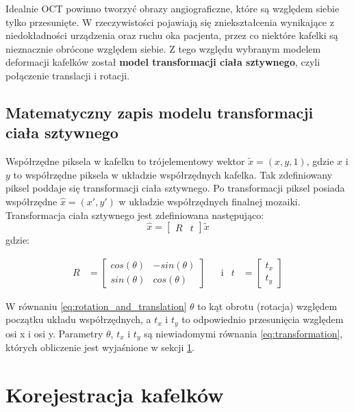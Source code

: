 Idealnie OCT powinno tworzyć obrazy angiograficzne, które są względem siebie tylko przesunięte. W rzeczywistości pojawiają się zniekształcenia wynikające z niedokładności urządzenia oraz ruchu oka pacjenta, przez co niektóre kafelki są nieznacznie obrócone względem siebie. Z tego względu wybranym modelem deformacji kafelków został \textbf{model transformacji ciała sztywnego}, czyli połączenie translacji i rotacji.

\subsection{Matematyczny zapis modelu transformacji ciała sztywnego}

Współrzędne piksela w kafelku to trójelementowy wektor $\widetilde{x}=(x, y, 1)$, gdzie $x$ i $y$ to współrzędne piksela w układzie współrzędnych kafelka. Tak zdefiniowany piksel poddaje się transformacji ciała sztywnego. Po transformacji piksel posiada współrzędne $\hat{x}=(x', y')$ w układzie współrzędnych finalnej mozaiki. Transformacja ciała sztywnego jest zdefiniowana następująco:
\begin{equation}
\hat{x}=\begin{bmatrix}R&t\end{bmatrix}\widetilde{x}
\label{eq:transformation}
\end{equation}
gdzie:

\begin{align}
R &= \begin{bmatrix}cos(\theta)&-sin(\theta)\\sin(\theta)&cos(\theta)\end{bmatrix} &&\text{i} & t &= \begin{bmatrix}t_{x}\\t_{y}\end{bmatrix}
\label{eq:rotation_and_translation}
\end{align}

W równaniu \ref{eq:rotation_and_translation} $\theta$ to kąt obrotu (rotacja) względem początku układu współrzędnych, a $t_{x}$ i $t_{y}$ to odpowiednio przesunięcia względem osi x i osi y. Parametry $\theta$, $t_{x}$ i $t_{y}$ są niewiadomymi równania \ref{eq:transformation}, których obliczenie jest wyjaśnione w sekcji \ref{sec:algorytmy_korejestracji:korejestracja_kafelow}.

\section{Korejestracja kafelków}
\label{sec:algorytmy_korejestracji:korejestracja_kafelow}

